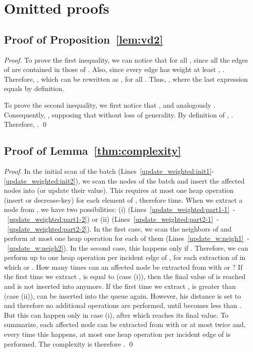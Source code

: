 \documentclass[english]{llncs}
\newcommand{\vd}{\xspace}
\newcommand{\vda}{\xspace}
\begin{document}
\section{Omitted proofs}
\label{sec:proofs}
\subsection{Proof of Proposition~\ref{lem:vd2}}
\label{sub:proof_vd2}
\begin{proof}
To prove the first inequality, we can notice that  for all , since all the edges of  are contained in those of . Also, since every edge has weight at least , . Therefore, , which can be rewritten as , for all . Thus, , where the last expression equals \vda by definition.

To prove the second inequality, we first notice that ,
 and analogously . Consequently, , supposing that  without loss of generality. By definition of \vd, . Therefore, .
 \qed
\end{proof}

\subsection{Proof of Lemma~\ref{thm:complexity}}
\label{sub:proof_complexity}
\begin{proof}
In the initial scan of the batch (Lines~\ref{update_weighted:init1}-\ref{update_weighted:init2}), we scan the nodes of the batch and insert the affected nodes into  (or update their value). This requires at most one heap operation (insert or decrease-key) for each element of , therefore  time.
When we extract a node  from , we have two possibilities: (i)  (Lines~\ref{update_weighted:part1-1}~-~\ref{update_weighted:part1-2}) or (ii)  (Lines~\ref{update_weighted:part2-1}~-~\ref{update_weighted:part2-2}). In the first case, we scan the neighbors of  and perform at most one heap operation for each of them (Lines~\ref{update_w:neigh1}~-~\ref{update_w:neigh2}). In the second case, this happens only if . Therefore, we can perform up to one heap operation per incident edge of , for each extraction of  in which  or .
How many times can an affected node  be extracted from  with  or ? If the first time we extract ,  is equal to  (case (i)), then the final value of  is reached and  is not inserted into  anymore. If the first time we extract ,  is greater than  (case (ii)),  can be inserted into the queue again. However, his distance is set to  and therefore no additional operations are performed, until  becomes less than . But this can happen only in case (i), after which  reaches its final value. To summarize, each affected node  can be extracted from  with  or  at most twice and, every time this happens, at most one heap operation per incident edge of  is performed. The complexity is therefore . \qed
\end{proof}
\end{document}
